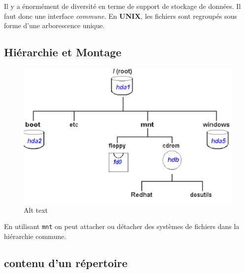 Il y a énormément de diversité en terme de support de stockage de
données. Il faut donc une interface \emph{commune}. En \textbf{UNIX},
les fichiers sont regroupés sous forme d'une arborescence unique.

\subsection{Hiérarchie et Montage}\label{hiuxe9rarchie-et-montage}

\begin{figure}
\centering
\includegraphics{image-34.png}
\caption{Alt text}
\end{figure}

En utilisant \texttt{mnt} on peut attacher ou détacher des systèmes de
fichiers dans la hiérarchie commune.

\subsection{contenu d'un répertoire}\label{contenu-dun-ruxe9pertoire}

